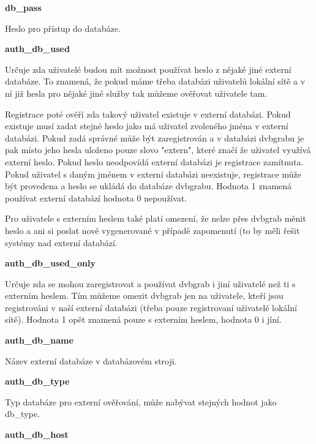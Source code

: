\textbf{db\_pass}

Heslo pro přístup do databáze.

\vspace{10pt}

\textbf{auth\_db\_used}

Určuje zda uživatelé budou mít možnost používat heslo z nějaké jiné externí databáze. To znamená, že pokud máme třeba databázi uživatelů lokální sítě a v ní již hesla pro nějaké jiné služby tak můžeme ověřovat uživatele tam.

Registrace poté ověří zda takový uživatel existuje v externí databázi. Pokud existuje musí zadat stejné heslo jako má uživatel zvoleného jména v externí databázi. Pokud zadá správné může být zaregistrován a v databázi dvbgrabu je pak místo jeho hesla uloženo pouze slovo "extern", které značí že uživatel využívá externí heslo. Pokud heslo neodpovídá externí databázi je registrace zamítnuta. Pokud uživatel s daným jménem v externí databázi neexistuje, registrace může být provedena a heslo se ukládá do databáze dvbgrabu. Hodnota 1 znamená používat externí databází hodnota 0 nepoužívat.

Pro uživatele s externím heslem také platí omezení, že nelze přes dvbgrab měnit heslo a ani si poslat nově vygenerované v případě zapomenutí (to by měli řešit systémy nad externí databází.

\vspace{10pt}

\textbf{auth\_db\_used\_only}

Určuje zda se mohou zaregistrovat a používat dvbgrab i jiní uživatelé než ti s externím heslem. Tím můžeme omezit dvbgrab jen na uživatele, kteří jsou registrováni v naší externí databázi (třeba pouze registrovaní uživatelé lokální sítě). Hodnota 1 opět znamená pouze s externím heslem, hodnota 0 i jíní.

\vspace{10pt}

\textbf{auth\_db\_name}

Název externí databáze v databázovém stroji.

\vspace{10pt}

\textbf{auth\_db\_type}

Typ databáze pro externí ověřování, může nabývat stejných hodnot jako db\_type.

\vspace{10pt}

\textbf{auth\_db\_host}

